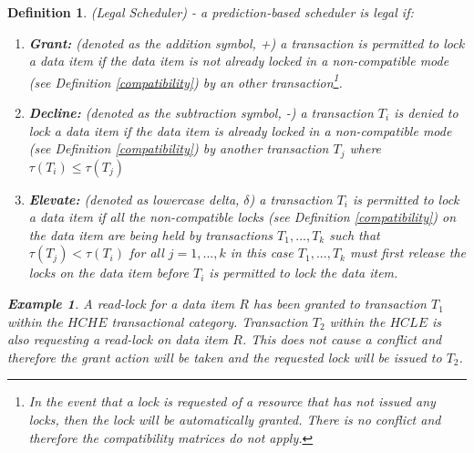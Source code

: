 \documentclass[conference]{IEEEtran}
\newtheorem{definition}{Definition}
\newtheorem{example}{Example}[definition]
\begin{document}
\begin{definition}
\label{legal_scheduler}
 (Legal Scheduler) - a prediction-based scheduler is legal if:
 
 \begin{enumerate}
    \item \textbf{Grant:} (denoted as the addition symbol, +) a transaction is permitted to lock a data item if the data item is not already locked in a non-compatible mode (see Definition \ref{compatibility}) by an other transaction\footnote{In the event that a lock is requested of a resource that has not issued any locks, then the lock will be automatically granted. There is no conflict and therefore the compatibility matrices do not apply.}.
    \item \textbf{Decline:} (denoted as the subtraction symbol, -) a transaction $T_{i}$ is denied to lock a data item if the data item is already locked in a non-compatible mode (see Definition \ref{compatibility}) by another transaction $T_{j}$ where $\tau(T_{i}) \le \tau(T_{j})$
    \item \textbf{Elevate:} (denoted as lowercase delta, $\delta$) a transaction $T_{i}$ is permitted to lock a data item if all the non-compatible locks (see Definition \ref{compatibility}) on the data item are being held by transactions $T_{1}, ... , T_{k}$ such that $\tau(T_{j}) < \tau(T_{i})$ for all $j = 1, ..., k$ in this case $T_{1}, ... , T_{k}$ must first release the locks on the data item before $T_{i}$ is permitted to lock the data item.
 \end{enumerate}

 
 \begin{example}
 \label{ex_grant_action}
  A read-lock for a data item $R$ has been granted to transaction $T_{1}$ within the $HCHE$ transactional category. Transaction $T_{2}$ within the $HCLE$ is also requesting a read-lock on data item $R$. This does not cause a conflict and therefore the grant action will be taken and the requested lock will be issued to $T_{2}$.
 \end{example}
 

\end{definition}
\end{document}
